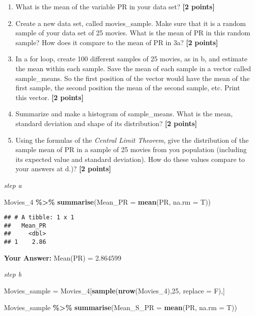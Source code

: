 \documentclass[
]{article}
\newenvironment{Shaded}{\begin{snugshade}}{\end{snugshade}}
\newcommand{\AttributeTok}[1]{\textcolor[rgb]{0.13,0.29,0.53}{#1}}
\newcommand{\DecValTok}[1]{\textcolor[rgb]{0.00,0.00,0.81}{#1}}
\newcommand{\FunctionTok}[1]{\textcolor[rgb]{0.13,0.29,0.53}{\textbf{#1}}}
\newcommand{\NormalTok}[1]{#1}
\newcommand{\OtherTok}[1]{\textcolor[rgb]{0.56,0.35,0.01}{#1}}
\newcommand{\SpecialCharTok}[1]{\textcolor[rgb]{0.81,0.36,0.00}{\textbf{#1}}}
\providecommand{\tightlist}{%
  \setlength{\itemsep}{0pt}\setlength{\parskip}{0pt}}
\begin{document}
\begin{enumerate}
\def\labelenumi{\alph{enumi}.}
\tightlist
\item
  What is the mean of the variable PR in your data set?
  \textbf{[2 points]}
\item
  Create a new data set, called movies\_sample. Make sure that it is a
  random sample of your data set of 25 movies. What is the mean of PR in
  this random sample? How does it compare to the mean of PR in 3a?
  \textbf{[2 points]}
\item
  In a for loop, create 100 different samples of 25 movies, as in b, and
  estimate the mean within each sample. Save the mean of each sample in
  a vector called sample\_means. So the first position of the vector
  would have the mean of the first sample, the second position the mean
  of the second sample, etc. Print this vector. \textbf{[2 points]}
\item
  Summarize and make a histogram of sample\_means. What is the mean,
  standard deviation and shape of its distribution? \textbf{[2 points]}
\item
  Using the formulas of the \emph{Central Limit Theorem}, give the
  distribution of the sample mean of PR in a sample of 25 movies from
  you population (including its expected value and standard deviation).
  How do these values compare to your answers at d.)?
  \textbf{[2 points]}
\end{enumerate}

\emph{step a}

\begin{Shaded}
\begin{Highlighting}[]
\NormalTok{Movies\_4 }\SpecialCharTok{\%\textgreater{}\%}
    \FunctionTok{summarise}\NormalTok{(}\AttributeTok{Mean\_PR =} \FunctionTok{mean}\NormalTok{(PR, }\AttributeTok{na.rm =}\NormalTok{ T))}
\end{Highlighting}
\end{Shaded}

\begin{verbatim}
## # A tibble: 1 x 1
##   Mean_PR
##     <dbl>
## 1    2.86
\end{verbatim}

\textbf{Your Answer:} Mean(PR) = 2.864599

\emph{step b}

\begin{Shaded}
\begin{Highlighting}[]
\NormalTok{Movies\_sample }\OtherTok{=}\NormalTok{ Movies\_4[}\FunctionTok{sample}\NormalTok{(}\FunctionTok{nrow}\NormalTok{(Movies\_4),}\DecValTok{25}\NormalTok{, }\AttributeTok{replace =}\NormalTok{ F),]}

\NormalTok{Movies\_sample }\SpecialCharTok{\%\textgreater{}\%}
    \FunctionTok{summarise}\NormalTok{(}\AttributeTok{Mean\_S\_PR =} \FunctionTok{mean}\NormalTok{(PR, }\AttributeTok{na.rm =}\NormalTok{ T))}
\end{Highlighting}
\end{Shaded}
\end{document}

